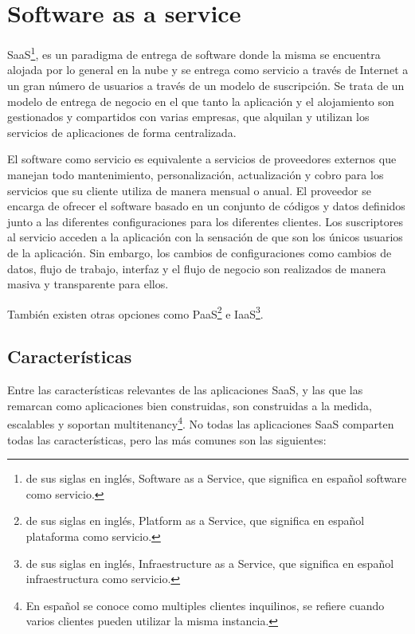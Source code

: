 \section{Software as a service}
SaaS\footnote{de sus siglas en inglés, Software as a Service, que significa en español software como servicio.}, es un paradigma de entrega de software donde la misma se encuentra alojada por lo general en la nube y se entrega como servicio a través de Internet a un gran número de usuarios a través de un modelo de suscripción. Se trata de un modelo de entrega de negocio en el que tanto la aplicación y el alojamiento son gestionados y compartidos con varias empresas, que alquilan y utilizan los servicios de aplicaciones de forma centralizada\citep{gupta_software_2014}.

El software como servicio es equivalente a servicios de proveedores externos que manejan todo mantenimiento, personalización, actualización y cobro para los servicios que su cliente utiliza de manera mensual o anual. El proveedor se encarga de ofrecer el software basado en un conjunto de códigos y datos definidos junto a las diferentes configuraciones para los diferentes clientes. Los suscriptores al servicio acceden a la aplicación con la sensación de que son los únicos usuarios de la aplicación. Sin embargo, los cambios de configuraciones como cambios de datos, flujo de trabajo, interfaz y el flujo de negocio son realizados de manera masiva y transparente para ellos\citep{kumar_cloud_2012}\citep{kang_web_2012}.

También existen otras opciones como PaaS\footnote{de sus siglas en inglés, Platform as a Service, que significa en español plataforma como servicio.} e IaaS\footnote{de sus siglas en inglés, Infraestructure as a Service, que significa en español infraestructura como servicio.}.

\subsection{Características}
Entre las características relevantes de las aplicaciones SaaS, y las que las remarcan como aplicaciones bien construidas, son construidas a la medida, escalables y soportan multitenancy\footnote{En español se conoce como multiples clientes inquilinos, se refiere cuando varios clientes pueden utilizar la misma instancia.}. No todas las aplicaciones SaaS comparten todas las características, pero las más comunes son las siguientes: 

